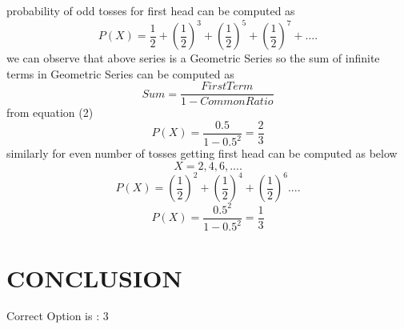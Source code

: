 \documentclass[journal,12pt,twocolumn]{IEEEtran}
\begin{document}
probability of odd tosses for first head can be computed as
\begin{equation}
    P(X)=\frac{1}{2}+(\frac{1}{2})^3+(\frac{1}{2})^5+(\frac{1}{2})^7+....
\end{equation}
we can observe that above series is a Geometric Series so the sum of infinite terms in Geometric Series can be computed as
\begin{equation}
    Sum=\frac{FirstTerm}{1-Common Ratio}
\end{equation}
from equation (2)
\begin{equation}
     P(X)=\frac{0.5}{1-0.5^2}=\frac{2}{3}
\end{equation}
similarly for even number of tosses getting first head can be computed as below 
\begin{equation}
    X=2,4,6,....
\end{equation}
\begin{equation}
    P(X)=(\frac{1}{2})^2+(\frac{1}{2})^4+(\frac{1}{2})^6....
\end{equation}
\begin{equation}
    P(X)=\frac{0.5^2}{1-0.5^2}=\frac{1}{3}
\end{equation}

\section{\textbf{CONCLUSION}}
        Correct Option is : 3
\end{document}
